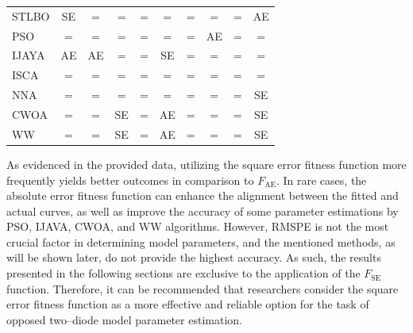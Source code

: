 \documentclass[a4paper,fleqn]{cas-dc}
\begin{document}
\begin{table}[<options>]
\begin{tabular*}{\tblwidth}{@{}LCCCCCCCCC@{}}
STLBO &SE &=  &=  &=  &=  &=  &=  &=  & AE \\
PSO &=  &=  &=  &=  &=  &=  & AE &=  &=  \\
IJAYA & AE & AE & = &=  &SE & = & = &=  &=  \\
ISCA &=  &=  &=  &=  &=  &=  &=  &=  &=  \\
NNA &=  &=  &=  &=  &=  &=  &=  &=  & SE\\
CWOA &=  &=  & SE&=  &  AE&=  &=  &=  &SE \\
WW &=  &=  & SE& = & AE & = &=  &=  & SE\\
\bottomrule
\end{tabular*}
\end{table}

As evidenced in the provided data, utilizing the square error fitness function more frequently yields better outcomes in comparison to $F_\mathrm{AE}$.
In rare cases, the absolute error fitness function can enhance the alignment between the fitted and actual curves,
as well as improve the accuracy of some parameter estimations by PSO, IJAVA, CWOA, and WW algorithms.
However, RMSPE is not the most crucial factor in determining model parameters, and the mentioned methods,
as will be shown later, do not provide the highest accuracy.
As such, the results presented in the following sections are exclusive to the application of the $F_\mathrm{SE}$ function.
Therefore, it can be recommended that researchers consider
the square error fitness function as a more effective and reliable option for the task of opposed two--diode model parameter estimation.
\end{document}
